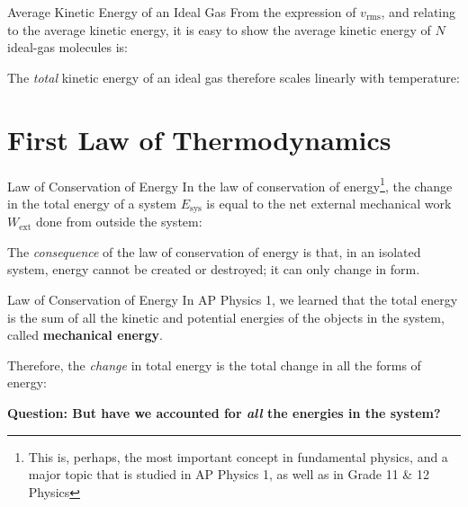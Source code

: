 \documentclass[12pt,aspectratio=169,dvipsnames]{beamer}
\begin{document}
\begin{frame}{Average Kinetic Energy of an Ideal Gas}
  From the expression of $v_\text{rms}$, and relating to the average kinetic
  energy, it is easy to show the average kinetic energy of $N$ ideal-gas
  molecules is:
  

  The \emph{total} kinetic energy of an ideal gas therefore scales linearly
  with temperature:

\end{frame}



\section{First Law of Thermodynamics}


\begin{frame}{Law of Conservation of Energy}
  In the law of conservation of energy\footnote{This is, perhaps, the most
  important concept in fundamental physics, and a major topic that is studied
  in AP Physics 1, as well as in Grade 11 \& 12 Physics}, the change in the
  total energy of a system $E_\text{sys}$ is equal to the net external
  mechanical work $W_\text{ext}$ done from outside the system:


  The \emph{consequence} of the law of conservation of energy is that, in an
  isolated system, energy cannot be created or destroyed; it can only change in
  form.
\end{frame}



\begin{frame}{Law of Conservation of Energy}
  In AP Physics 1, we learned that the total energy is the sum of all the
  kinetic and potential energies of the objects in the system, called
  \textbf{mechanical energy}.


  Therefore, the \emph{change} in total energy is the total change in all the
  forms of energy:
  


  \textbf{Question: But have we accounted for \emph{all} the energies in the
    system?}
\end{frame}
\end{document}
